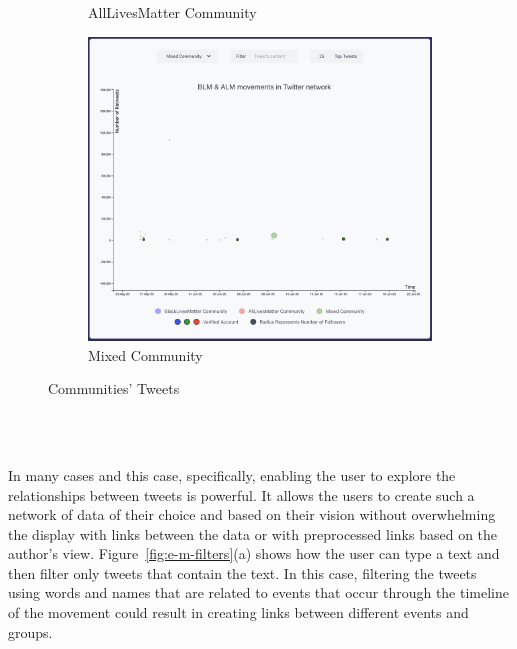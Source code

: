 \begin{figure}[H]
\begin{subfigure}{.5\textwidth}
  \caption{AllLivesMatter Community}
  \label{fig:sub-second}
\end{subfigure}
\begin{subfigure}{.5\textwidth}
  \centering
  \captionsetup{justification=centering}
  \includegraphics[width=1\linewidth]{Report-latex/tex_files/pics/example/emixed.png}  
  \caption{Mixed Community}
  \label{fig:sub-second}
\end{subfigure}

\captionsetup{justification=centering}
\caption{Communities' Tweets }
\label{fig:e-coms}
\end{figure}

\newpage



\\\

In many cases and this case, specifically, enabling the user to explore the relationships between tweets is powerful. It allows the users to create such a network of data of their choice and based on their vision without overwhelming the display with links between the data or with preprocessed links based on the author's view. 
Figure~\ref{fig:e-m-filters}(a) shows how the user can type a text and then filter only tweets that contain the text. In this case, filtering the tweets using words and names that are related to events that occur through the timeline of the movement could result in creating links between different events and groups. 

